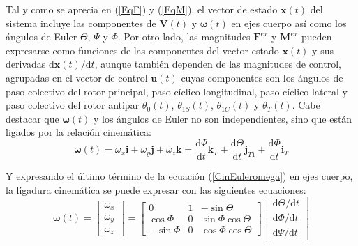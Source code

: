 Tal y como se aprecia en (\ref{EqF}) y (\ref{EqM}), el vector de estado $\mathrm{\textbf{x}}(t)$ del sistema incluye las componentes de $\mathrm{\textbf{V}}(t)$ y $\boldsymbol{\omega}(t)$
en ejes cuerpo así como los ángulos de Euler $\Theta$, $\Psi$ y $\Phi$. Por otro lado, las magnitudes $\mathrm{\textbf{F}}^{ex}$ y $\mathrm{\textbf{M}}^{ex}$ pueden expresarse como funciones de las componentes del vector estado $\mathrm{\textbf{x}}(t)$ y sus derivadas $\mathrm{d\textbf{x}}(t)/\mathrm{d}t$, aunque también dependen de las magnitudes de control, agrupadas en el vector de control $\mathrm{\textbf{u}}(t)$ cuyas componentes son los ángulos de paso colectivo del rotor principal, paso cíclico longitudinal, paso cíclico lateral y paso colectivo del rotor antipar $\theta_0(t)$, $\theta_{1S}(t)$, $\theta_{1C}(t)$ y $\theta_T(t)$.
Cabe destacar que $\boldsymbol{\omega}(t)$ y los ángulos de Euler no son independientes, sino que están ligados por la relación cinemática:
\begin{equation}
	\boldsymbol{\omega}(t)=\omega_x\textbf{i}+\omega_y\textbf{j}+\omega_z\textbf{k}=\frac{\mathrm{d}\Psi}{\mathrm{d}t}\textbf{k}_T+\frac{\mathrm{d}\Theta}{\mathrm{d}t}\textbf{j}_{T1}+\frac{\mathrm{d}\Phi}{\mathrm{d}t}\textbf{i}_T
	\label{CinEuleromega}
\end{equation}

Y expresando el último término de la ecuación (\ref{CinEuleromega}) en ejes cuerpo, la ligadura cinemática se puede expresar con las siguientes ecuaciones:
\begin{equation}
	\boldsymbol{\omega}(t)=\left[
	\begin{array}{c}
	\omega_x\\
	\omega_y\\
	\omega_z
	\end{array}
	\right]=\left[	
	\begin{array}{ccc}
	0 & 1 & -\sin\Theta\\
	\cos\Phi & 0 & \sin\Phi\cos\Theta\\
	-\sin\Phi & 0 & \cos\Phi\cos\Theta
	\end{array}
	\right]\left[
	\begin{array}{c}
	\mathrm{d}\Theta/\mathrm{d}t\\
	\mathrm{d}\Phi/\mathrm{d}t\\
	\mathrm{d}\Psi/\mathrm{d}t
	\end{array}
	\right]
	\label{CinEuleromega2}
\end{equation}

